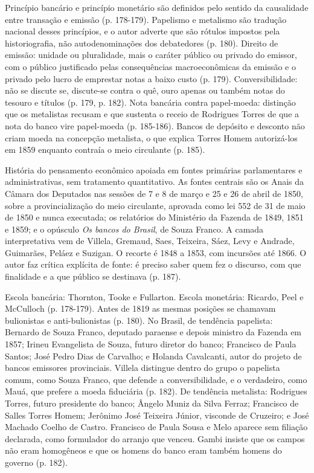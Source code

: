 Princípio bancário e princípio monetário são definidos pelo sentido da
causalidade entre transação e emissão (p. 178-179). Papelismo e metalismo são
tradução nacional desses princípios, e o autor adverte que são rótulos impostos
pela historiografia, não autodenominações dos debatedores (p. 180). Direito de
emissão: unidade ou pluralidade, mais o caráter público ou privado do emissor,
com o público justificado pelas consequências macroeconômicas da emissão e o
privado pelo lucro de emprestar notas a baixo custo (p. 179). Conversibilidade:
não se discute se, discute-se contra o quê, ouro apenas ou também notas do
tesouro e títulos (p. 179, p. 182). Nota bancária contra papel-moeda: distinção
que os metalistas recusam e que sustenta o receio de Rodrigues Torres de que a
nota do banco vire papel-moeda (p. 185-186). Bancos de depósito e desconto não
criam moeda na concepção metalista, o que explica Torres Homem autorizá-los em
1859 enquanto contraía o meio circulante (p. 185).

História do pensamento econômico apoiada em fontes primárias parlamentares e
administrativas, sem tratamento quantitativo. As fontes centrais são os Anais
da Câmara dos Deputados nas sessões de 7 e 8 de março e 25 e 26 de abril de
1850, sobre a provincialização do meio circulante, aprovada como lei 552 de 31
de maio de 1850 e nunca executada; os relatórios do Ministério da Fazenda de
1849, 1851 e 1859; e o opúsculo \emph{Os bancos do Brasil}, de Souza Franco. A
camada interpretativa vem de Villela, Gremaud, Saes, Teixeira, Sáez, Levy e
Andrade, Guimarães, Peláez e Suzigan. O recorte é 1848 a 1853, com incursões
até 1866. O autor faz crítica explícita de fonte: é preciso saber quem fez o
discurso, com que finalidade e a que público se destinava (p. 187).

Escola bancária: Thornton, Tooke e Fullarton. Escola monetária: Ricardo, Peel e
McCulloch (p. 178-179). Antes de 1819 as mesmas posições se chamavam
bulionistas e anti-bulionistas (p. 180). No Brasil, de tendência papelista:
Bernardo de Souza Franco, deputado paraense e depois ministro da Fazenda em
1857; Irineu Evangelista de Souza, futuro diretor do banco; Francisco de Paula
Santos; José Pedro Dias de Carvalho; e Holanda Cavalcanti, autor do projeto de
bancos emissores provinciais. Villela distingue dentro do grupo o papelista
comum, como Souza Franco, que defende a conversibilidade, e o verdadeiro, como
Mauá, que prefere a moeda fiduciária (p. 182). De tendência metalista:
Rodrigues Torres, futuro presidente do banco; Ângelo Muniz da Silva Ferraz;
Francisco de Salles Torres Homem; Jerônimo José Teixeira Júnior, visconde de
Cruzeiro; e José Machado Coelho de Castro. Francisco de Paula Sousa e Melo
aparece sem filiação declarada, como formulador do arranjo que venceu. Gambi
insiste que os campos não eram homogêneos e que os homens do banco eram também
homens do governo (p. 182).

